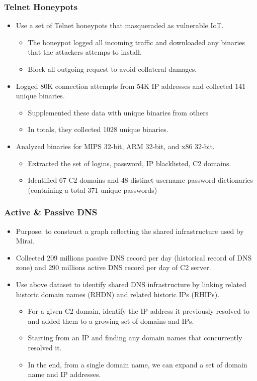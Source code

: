\documentclass{beamer}
\begin{document}
\begin{frame}
	\frametitle{Telnet Honeypots}
	\begin{itemize}
		\item<+-> Use a set of Telnet honeypots that masqueraded as vulnerable IoT. 
		\begin{itemize}
			\item<+-> The honeypot logged all incoming traffic and downloaded any binaries that the attackers attemps to install.
			\item<+-> Block all outgoing request to avoid collateral damages.
		\end{itemize}
		\item<+-> Logged 80K connection attempts from 54K IP addresses and collected 141 unique binaries.
		\begin{itemize}
			\item<+-> Supplemented these data with unique binaries from others
			\item<+-> In totals, they collected 1028 unique binaries.
		\end{itemize}
		\item<+-> Analyzed binaries for MIPS 32-bit, ARM 32-bit, and x86 32-bit.
		\begin{itemize}
			\item<+-> Extracted the set of logins, password, IP blacklisted, C2 domains.
			\item<+-> Identified 67 C2 domains and 48 distinct username password dictionaries (containing a total 371 unique passwords)
		\end{itemize}
	\end{itemize}
\end{frame}

\begin{frame}
	\frametitle{Active \& Passive DNS}
	\begin{itemize}
		\item<+-> Purpose: to construct a graph reflecting the shared infrastructure used by Mirai.
		\item<+-> Collected 209 millions passive DNS record per day (historical record of DNS zone) and 290 millions active DNS record per day of C2 server.
		\item<+-> Use above dataset to identify shared DNS infrastructure by linking related historic domain names (RHDN) and related historic IPs (RHIPs).
		\begin{itemize}
			\item<+-> For a given C2 domain, identify the IP address it previously resolved to and added them to a growing set of domains and IPs.
			\item<+-> Starting from an IP and finding any domain names that concurrently resolved it.
			\item<+-> In the end, from a single domain name, we can expand a set of domain name and IP addresses.
		\end{itemize}
	\end{itemize}
\end{frame}
\end{document}
